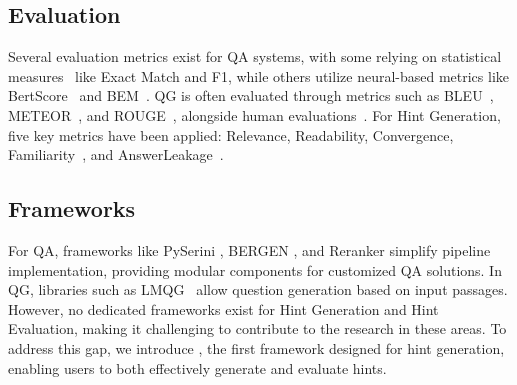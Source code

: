 \subsection{Evaluation} \label{ss:related_work_evaluation}
Several evaluation metrics exist for QA systems, with some relying on statistical measures~\cite{jurafsky2013} like Exact Match and F1, while others utilize neural-based metrics like BertScore~\cite{Zhang2020BERTScore} and BEM~\cite{bulian-etal-2022-tomayto}. QG is often evaluated through metrics such as BLEU~\cite{10.3115/1073083.1073135}, METEOR~\cite{banerjee-lavie-2005-meteor}, and ROUGE~\cite{lin-2004-rouge}, alongside human evaluations~\cite{liu2020semantics}. For Hint Generation, five key metrics have been applied: Relevance, Readability, Convergence, Familiarity~\cite{mozafari-triviahg}, and AnswerLeakage~\cite{2024arXiv241201626M}.

\subsection{Frameworks} \label{ss:related_work_framework}
For QA, frameworks like PySerini \cite{10.1145/3404835.3463238}, BERGEN \cite{2024arXiv240701102R}, and Reranker \cite{2024arXiv240817344C} simplify pipeline implementation, providing modular components for customized QA solutions. In QG, libraries such as LMQG~\cite{ushio-etal-2023-practical} allow question generation based on input passages. However, no dedicated frameworks exist for Hint Generation and Hint Evaluation, making it challenging to contribute to the research in these areas.
To address this gap, we introduce \framework, the first framework designed for hint generation, enabling users to both effectively generate and evaluate hints.